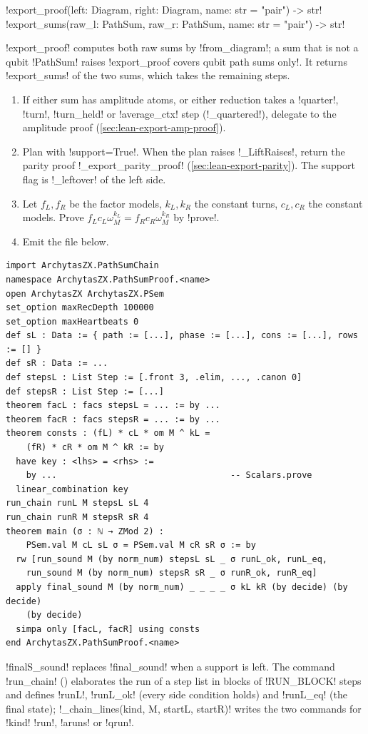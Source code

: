 {{{\begin{signature}
\lexpy!export_proof(left: Diagram, right: Diagram, name: str = "pair") -> str!\\
\lexpy!export_sums(raw_l: PathSum, raw_r: PathSum, name: str = "pair") -> str!
\end{signature}
\lexpy!export_proof! computes both raw sums by \lexpy!from_diagram!; a sum that is not a qubit
\lexpy!PathSum! raises \lexcode!export_proof covers qubit path sums only!. It returns
\lexpy!export_sums! of the two sums, which takes the remaining steps.
\begin{algorithm}\label{alg:lean-export-proof}
\begin{enumerate}
\item If either sum has amplitude atoms, or either reduction takes a \lexcode!quarter!, \lexcode!turn!,
\lexcode!turn_held! or \lexcode!average_ctx! step (\lexpy!_quartered!), delegate to the amplitude proof
(\cref{sec:lean-export-amp-proof}).
\item Plan with \lexpy!support=True!. When the plan raises \lexpy!_LiftRaises!, return the parity
proof \lexpy!_export_parity_proof! (\cref{sec:lean-export-parity}). The support flag is
\lexpy!_leftover! of the left side.
\item Let $f_L, f_R$ be the factor models, $k_L, k_R$ the constant turns, $c_L, c_R$ the
constant models. Prove $f_L c_L \omega_M^{k_L} = f_R c_R \omega_M^{k_R}$ by \lexpy!prove!.
\item Emit the file below.
\end{enumerate}
\end{algorithm}
\begin{lstlisting}[style=lexlean]
import ArchytasZX.PathSumChain
namespace ArchytasZX.PathSumProof.<name>
open ArchytasZX ArchytasZX.PSem
set_option maxRecDepth 100000
set_option maxHeartbeats 0
def sL : Data := { path := [...], phase := [...], cons := [...], rows := [] }
def sR : Data := ...
def stepsL : List Step := [.front 3, .elim, ..., .canon 0]
def stepsR : List Step := [...]
theorem facL : facs stepsL = ... := by ...
theorem facR : facs stepsR = ... := by ...
theorem consts : (fL) * cL * om M ^ kL =
    (fR) * cR * om M ^ kR := by
  have key : <lhs> = <rhs> :=
    by ...                                  -- Scalars.prove
  linear_combination key
run_chain runL M stepsL sL 4
run_chain runR M stepsR sR 4
theorem main (σ : ℕ → ZMod 2) :
    PSem.val M cL sL σ = PSem.val M cR sR σ := by
  rw [run_sound M (by norm_num) stepsL sL _ σ runL_ok, runL_eq,
    run_sound M (by norm_num) stepsR sR _ σ runR_ok, runR_eq]
  apply final_sound M (by norm_num) _ _ _ _ σ kL kR (by decide) (by decide)
    (by decide)
  simpa only [facL, facR] using consts
end ArchytasZX.PathSumProof.<name>
\end{lstlisting}
\lexlean!finalS_sound! replaces \lexlean!final_sound! when a support is left. The command
\lexlean!run_chain! () elaborates the run of a step list in
blocks of \lexpy!RUN_BLOCK! steps and defines \lexlean!runL!, \lexlean!runL_ok! (every side condition
holds) and \lexlean!runL_eq! (the final state); \lexpy!_chain_lines(kind, M, startL, startR)! writes
the two commands for \lexcode!kind! \lexcode!run!, \lexcode!aruns! or \lexcode!qrun!.

}}}
